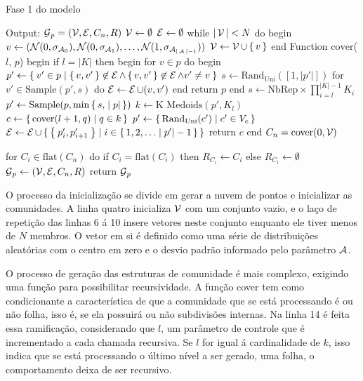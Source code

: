 \documentclass[notes.tex]{subfiles}
\begin{document}
\begin{quadro}[htbp]
\caption{Fase 1 do modelo}
\label{qua:fase_1}
\begin{algorithm}
Output: $\operatorname{\mathcal{G}}_p = (\operatorname{\mathcal{V}}, \operatorname{\mathcal{E}}, C_n, R)$
$\operatorname{\mathcal{V}} \leftarrow \emptyset$
$\operatorname{\mathcal{E}} \leftarrow \emptyset$
while $|\operatorname{\mathcal{V}}| < N$ do
begin
    $v \leftarrow (\mathcal{N}(0, \sigma_{\operatorname{\mathcal{A}}_0}), \mathcal{N}(0, \sigma_{\operatorname{\mathcal{A}}_1}), \ldots, \mathcal{N}(1, \sigma_{\operatorname{\mathcal{A}}_{|\operatorname{\mathcal{A}}|-1}}))$
    $\operatorname{\mathcal{V}} \leftarrow \operatorname{\mathcal{V}} \cup \set{v}$
end
Function $\text{cover}$($l$, $p$)
begin
    if $l = |K|$ then
    begin
        for $v \in p$ do
        begin
            $p' \leftarrow \Set{v' \in p | \set{v, v'} \not\in \operatorname{\mathcal{E}}\land \set{v, v'} \not\in \operatorname{\mathcal{E}}\land v' \neq v}$
            $s \leftarrow \text{Rand}_\text{Uni}([1, |p'|])$
            for $v'\in \text{Sample}(p', s)$ do $\operatorname{\mathcal{E}} \leftarrow \operatorname{\mathcal{E}} \cup (v, v')$
        end
        return $p$
    end
    $s \leftarrow \text{NbRep}\times\prod_{i=l}^{|K|-1} K_i$
    $p' \leftarrow \text{Sample}(p, \min\set{s, |p|})$
    $k \leftarrow \text{K Medoids}(p', K_l)$ 
    $c \leftarrow \set{\text{cover}(l+1, q) | q \in k}$
    $p' \leftarrow \set{\text{Rand}_\text{Uni}(c') | c' \in V_c}$
    $\operatorname{\mathcal{E}} \leftarrow \operatorname{\mathcal{E}} \cup \set{\Set{p'_i, p'_{i+1}}| i \in \set{1, 2, \ldots |p'| -1}}$
    return $c$
end
$C_n = \text{cover}(0, \operatorname{\mathcal{V}})$

for $C_i \in \text{flat}(C_n)$ do
    if $C_i = \text{flat}(C_i)$ then $R_{C_i} \leftarrow C_i$
    else $R_{C_i} \leftarrow \emptyset$
$\operatorname{\mathcal{G}}_p \leftarrow (\operatorname{\mathcal{V}}, \operatorname{\mathcal{E}}, C_n, R)$
return $\operatorname{\mathcal{G}}_p$
\end{algorithm}
\end{quadro}

O processo da inicialização se divide em gerar a nuvem de pontos e inicializar as comunidades.
A linha quatro inicializa $\operatorname{\mathcal{V}}$ com um conjunto vazio, e o laço de repetição das linhas 6 á 10 insere vetores neste conjunto enquanto ele tiver menos de  $N$ membros.
O vetor em si é definido como uma série de distribuições aleatórias com o centro em zero e o desvio padrão informado pelo parâmetro $\operatorname{\mathcal{A}}$.

O processo de geração das estruturas de comunidade é mais complexo, exigindo uma função para possibilitar recursividade.
A função cover tem como condicionante a característica de que a comunidade que se está processando é ou não folha, isso é, se ela possuirá ou não subdivisões internas.
Na linha 14 é feita essa ramificação, considerando que $l$, um parâmetro de controle que é incrementado a cada chamada recursiva.
Se $l$ for igual á cardinalidade de $k$, isso indica que se está processando o último nível a ser gerado, uma folha, o comportamento deixa de ser recursivo.
\end{document}
